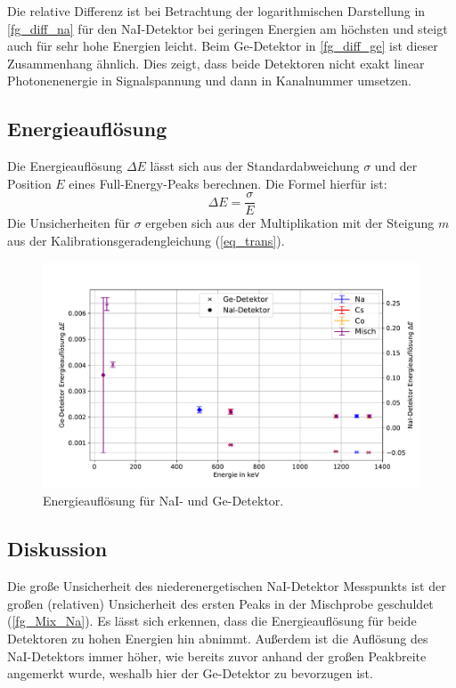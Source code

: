 \documentclass[
	a4paper,
	12pt,
	pagesize,
	ngerman
]{scrartcl}
\begin{document}
	Die relative Differenz ist bei Betrachtung der logarithmischen Darstellung in \cref{fg_diff_na} für den NaI-Detektor bei geringen Energien am höchsten und steigt auch für sehr hohe Energien leicht.
	Beim Ge-Detektor in \cref{fg_diff_ge} ist dieser Zusammenhang ähnlich.
	Dies zeigt, dass beide Detektoren nicht exakt linear Photonenenergie in Signalspannung und dann in Kanalnummer umsetzen.

\subsection{Energieauflösung}
Die Energieauflösung $\Delta E$ lässt sich aus der Standardabweichung $\sigma$ und der Position $E$ eines Full-Energy-Peaks berechnen.
Die Formel hierfür ist:
\begin{equation}
	\Delta E = \frac{\sigma}{E}
\end{equation}
Die Unsicherheiten für $\sigma$ ergeben sich aus der Multiplikation mit der Steigung $m$ aus der Kalibrationsgeradengleichung (\ref{eq_trans}).


	\begin{figure}[H]
			\includegraphics[width= 1 \linewidth]{img/res}
			\caption{
			Energieauflösung für NaI- und Ge-Detektor.
			}
			\label{fg_resolution}
	\end{figure}


\subsection{Diskussion}

Die große Unsicherheit des niederenergetischen NaI-Detektor Messpunkts ist der großen (relativen) Unsicherheit des ersten Peaks in der Mischprobe geschuldet (\cref{fg_Mix_Na}).
Es lässt sich erkennen, dass die Energieauflösung für beide Detektoren zu hohen Energien hin abnimmt.
Außerdem ist die Auflösung des NaI-Detektors immer höher, wie bereits zuvor anhand der großen Peakbreite angemerkt wurde, weshalb hier der Ge-Detektor zu bevorzugen ist.
\end{document}

